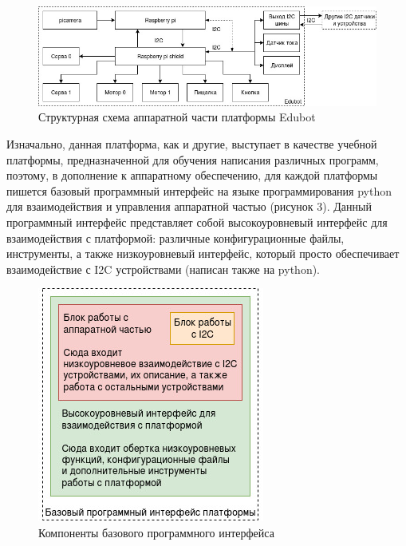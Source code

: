 \documentclass[a4paper,12pt]{article}
\begin{document}
\begin{figure}[h!]
\centering
\includegraphics[scale=0.5]{edubot_hardware.jpg}
\caption{Структурная схема аппаратной части платформы Edubot}
\label{fig:edubothardware}
\end{figure}

Изначально, данная платформа, как и другие, выступает в качестве учебной платформы, предназначенной для обучения написания различных программ, поэтому, в дополнение к аппаратному обеспечению, для каждой платформы пишется базовый программный интерфейс на языке программирования python для взаимодействия и управления аппаратной частью (рисунок 3). Данный программный интерфейс представляет собой высокоуровневый интерфейс для взаимодействия с платформой: различные конфигурационные файлы, инструменты, а также низкоуровневый интерфейс, который просто обеспечивает взаимодействие с I2C устройствами (написан также на python). 

\begin{figure}[h!]
\centering
\includegraphics[scale=0.8]{program.jpg}
\caption{Компоненты базового программного интерфейса}
\label{fig:program}
\end{figure}
\end{document}
